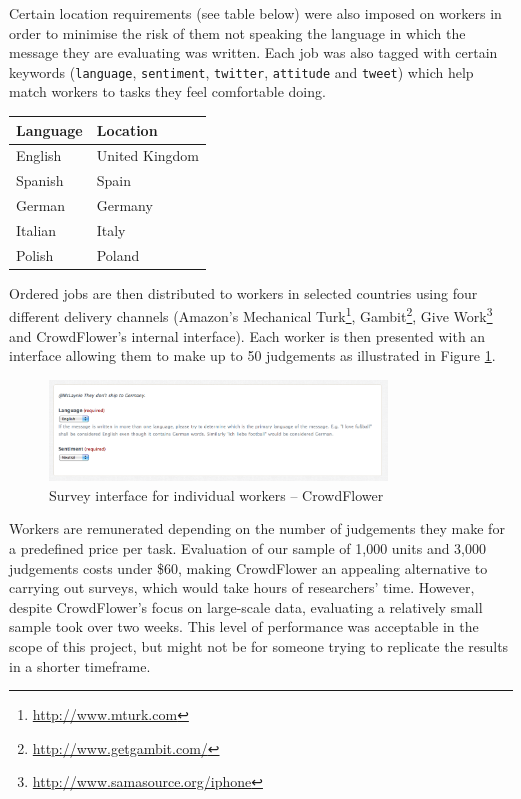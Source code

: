 Certain location requirements (see table below) were also imposed on workers in order to minimise the risk of them not speaking the language in which the message they are evaluating was written. Each job was also tagged with certain keywords (\verb|language|, \verb|sentiment|, \verb|twitter|, \verb|attitude| and \verb|tweet|) which help match workers to tasks they feel comfortable doing.

\begin{center}
  \begin{tabular}{ | l | l | }
    \hline
      {\bf Language} & {\bf Location} \\
    \hline
      English & United Kingdom \\
      Spanish & Spain \\
      German & Germany \\
      Italian & Italy \\
      Polish & Poland \\
    \hline
  \end{tabular}
\end{center}

Ordered jobs are then distributed to workers in selected countries using four different delivery channels (Amazon's Mechanical Turk\footnote{\url{http://www.mturk.com}}, Gambit\footnote{\url{http://www.getgambit.com/}}, Give Work\footnote{\url{http://www.samasource.org/iphone}} and CrowdFlower's internal interface). Each worker is then presented with an interface allowing them to make up to 50 judgements as illustrated in Figure \ref{fig:crowdflower-worker}.

\begin{figure}[htb]
  \begin{center}
    \includegraphics[width=0.8\textwidth]{crowdflower-worker.png}
    \caption{Survey interface for individual workers -- CrowdFlower}
    \label{fig:crowdflower-worker}
  \end{center}
\end{figure}

Workers are remunerated depending on the number of judgements they make for a predefined price per task. Evaluation of our sample of 1,000 units and 3,000 judgements costs under \$60, making CrowdFlower an appealing alternative to carrying out surveys, which would take hours of researchers' time. However, despite CrowdFlower's focus on large-scale data, evaluating a relatively small sample took over two weeks. This level of performance was acceptable in the scope of this project, but might not be for someone trying to replicate the results in a shorter timeframe.


